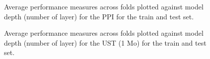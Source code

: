 
\begin{figure}


\caption{\label{fig-ppi}Average performance measures across folds plotted against model depth (number of layer) for the PPI for the train and test set.}

\end{figure}%


\begin{figure}


\caption{\label{fig-ust-1}Average performance measures across folds plotted against model depth (number of layer) for the UST (1 Mo) for the train and test set.}

\end{figure}%


